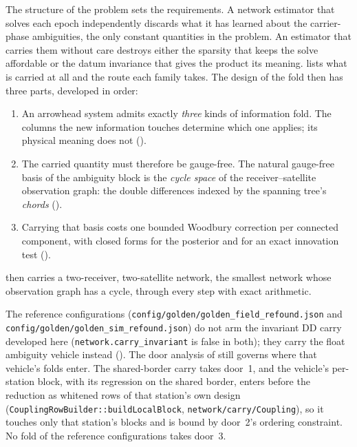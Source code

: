 \documentclass[main.tex]{subfiles}
\begin{document}
The structure of the problem sets the requirements.  A network estimator
that solves each epoch independently discards what it has learned about
the carrier-phase ambiguities, the only constant quantities in the
problem.  An estimator that carries them without care destroys either the
sparsity that keeps the solve affordable or the datum invariance that
gives the product its meaning.   lists what
is carried at all and the route each family takes.  The design of the
fold then has three parts, developed in order:

\begin{enumerate}[leftmargin=*, itemsep=1pt]
\item An arrowhead system admits exactly \emph{three} kinds of
      information fold.  The columns the new information touches
      determine which one applies; its physical meaning does not
      ().
\item The carried quantity must therefore be gauge-free.  The natural
      gauge-free basis of the ambiguity block is the \emph{cycle space}
      of the receiver--satellite observation graph: the double
      differences indexed by the spanning tree's \emph{chords}
      ().
\item Carrying that basis costs one bounded Woodbury correction per
      connected component, with closed forms for the posterior and for
      an exact innovation test ().
\end{enumerate}

 then carries a two-receiver,
two-satellite network, the smallest network whose observation graph
has a cycle, through every step with exact arithmetic.

The reference configurations (\texttt{config/golden/golden\_field\_refound.json}
and \texttt{config/golden/golden\_sim\_refound.json}) do not arm the
invariant DD carry developed here (\texttt{network.carry\_invariant} is
false in both); they carry the float ambiguity vehicle instead
().  The
door analysis of  still governs where that
vehicle's folds enter.  The shared-border carry takes door~1, and the
vehicle's per-station block, with its regression on the shared border,
enters before the reduction as whitened rows of that station's own
design (\texttt{CouplingRowBuilder::buildLocalBlock},
\texttt{network/carry/Coupling}), so it touches only that station's
blocks and is bound by door~2's ordering constraint.  No fold of the
reference configurations takes door~3.
\end{document}
